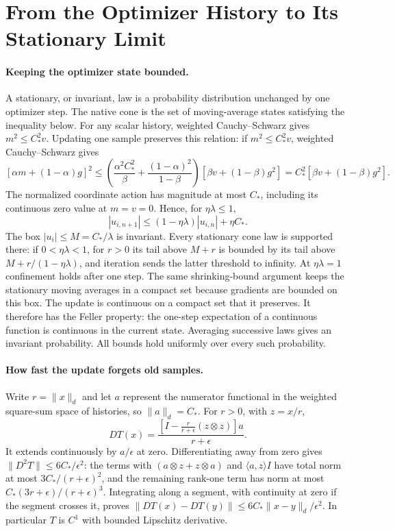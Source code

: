 \section{From the Optimizer History to Its Stationary Limit}
\label{app:transfer}

\paragraph{Keeping the optimizer state bounded.}
A stationary, or invariant, law is a probability distribution unchanged
by one optimizer step. The native cone is the set of moving-average
states satisfying the inequality below. For any scalar history, weighted
Cauchy--Schwarz gives
$m^2\leq C_*^2v$. Updating one sample preserves this relation: if
$m^2\leq C_*^2v$, weighted Cauchy--Schwarz gives
\[
 [\alpha m+(1-\alpha)g]^2
 \leq\left(\frac{\alpha^2C_*^2}{\beta}
           +\frac{(1-\alpha)^2}{1-\beta}\right)
       [\beta v+(1-\beta)g^2]
 =C_*^2[\beta v+(1-\beta)g^2].
\]
The normalized coordinate action has magnitude at most $C_*$, including
its continuous zero value at $m=v=0$. Hence, for $\eta\lambda\leq1$,
\[
 |u_{i,n+1}|\leq(1-\eta\lambda)|u_{i,n}|+\eta C_*.
\]
The box $|u_i|\leq M=C_*/\lambda$ is invariant. Every stationary cone law
is supported there: if $0<\eta\lambda<1$, for $r>0$ its tail above $M+r$ is bounded by its tail
above $M+r/(1-\eta\lambda)$, and iteration sends the latter threshold to
infinity. At $\eta\lambda=1$ confinement holds after one step.
The same shrinking-bound argument keeps the stationary moving averages
in a compact set because gradients are bounded on this box. The update
is continuous on a compact set that it preserves. It therefore has the
Feller property: the one-step expectation of a continuous function
is continuous in the current state.
Averaging successive laws gives an invariant probability. All bounds
hold uniformly over every such probability.

\paragraph{How fast the update forgets old samples.}
Write $r=\|x\|_d$ and let $a$ represent the numerator functional in
the weighted square-sum space of histories, so $\|a\|_d=C_*$. For $r>0$, with $z=x/r$,
\[
 DT(x)=\frac{[I-\tfrac r{r+\epsilon}(z\otimes z)]a}{r+\epsilon}.
\]
It extends continuously by $a/\epsilon$ at zero. Differentiating away
from zero gives $\|D^2T\|\leq6C_*/\epsilon^2$: the terms with
$(a\otimes z+z\otimes a)$ and $\langle a,z\rangle I$ have total
norm at most $3C_*/(r+\epsilon)^2$, and the remaining rank-one term
has norm at most $C_*(3r+\epsilon)/(r+\epsilon)^3$.
Integrating along a segment, with continuity at zero if the segment
crosses it, proves
$\|DT(x)-DT(y)\|\leq6C_*\|x-y\|_d/\epsilon^2$.
In particular $T$ is $C^1$ with bounded Lipschitz derivative.

